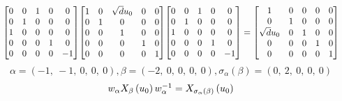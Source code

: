\documentclass[11pt]{article}
\theoremstyle{definition}
\begin{document}
\[
\scaletoalign{\textwidth}{{\left[\begin{matrix}0 & 0 & 1 & 0 & 0\\0 & 1 & 0 & 0 & 0\\1 & 0 & 0 & 0 & 0\\0 & 0 & 0 & 1 & 0\\0 & 0 & 0 & 0 & -1\end{matrix}\right]} {\left[\begin{matrix}1 & 0 & \sqrt{d} u_{0} & 0 & 0\\0 & 1 & 0 & 0 & 0\\0 & 0 & 1 & 0 & 0\\0 & 0 & 0 & 1 & 0\\0 & 0 & 0 & 0 & 1\end{matrix}\right]} {\left[\begin{matrix}0 & 0 & 1 & 0 & 0\\0 & 1 & 0 & 0 & 0\\1 & 0 & 0 & 0 & 0\\0 & 0 & 0 & 1 & 0\\0 & 0 & 0 & 0 & -1\end{matrix}\right]} = {\left[\begin{matrix}1 & 0 & 0 & 0 & 0\\0 & 1 & 0 & 0 & 0\\\sqrt{d} u_{0} & 0 & 1 & 0 & 0\\0 & 0 & 0 & 1 & 0\\0 & 0 & 0 & 0 & 1\end{matrix}\right]}}
\]
\[
\alpha = \left( -1, \  -1, \  0, \  0, \  0\right), \beta = \left( -2, \  0, \  0, \  0, \  0\right), \sigma_{\alpha}(\beta) = \left( 0, \  2, \  0, \  0, \  0\right)
\]
\[
\scaletoalign{\textwidth}{w_{\alpha} X_{\beta}\left(u_{0}\right) w_{\alpha}^{-1} = X_{\sigma_{\alpha}\left(\beta\right)}\left(u_{0}\right)}
\]
\end{document}
